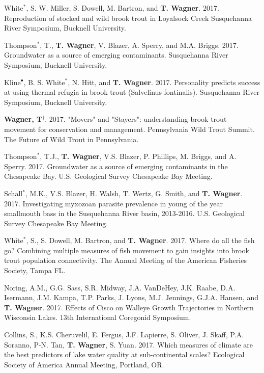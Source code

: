 \documentclass[10pt]{article}
\begin{document}
\begin{flushleft}
\begin{etaremune}
\item White$^*$, S. W. Miller, S. Dowell, M. Bartron, and {\bf T. Wagner}. 2017. Reproduction of stocked and wild brook trout in Loyalsock Creek  Susquehanna River Symposium, Bucknell University.

\item Thompson$^*$, T., {\bf T. Wagner}, V. Blazer, A. Sperry, and M.A. Briggs. 2017. Groundwater as a source of emerging contaminants. Susquehanna River Symposium, Bucknell University.

\item Kline$^\bullet$, B. S. White$^*$, N. Hitt, and {\bf T. Wagner}. 2017. Personality predicts success at using thermal refugia in brook trout (Salvelinus fontinalis). Susquehanna River Symposium, Bucknell University.

\item {\bf Wagner, T}$^\ddagger$. 2017. "Movers" and "Stayers": understanding brook trout movement for conservation and management. Pennsylvania Wild Trout Summit. The Future of Wild Trout in Pennsylvania.

\item Thompson$^*$, T.J., {\bf T. Wagner}, V.S. Blazer, P. Phillips, M. Briggs, and A. Sperry. 2017. Groundwater as a source of emerging contaminants in the Chesapeake Bay. U.S. Geological Survey Chesapeake Bay Meeting.

\item Schall$^*$, M.K., V.S. Blazer, H. Walsh, T. Wertz, G. Smith, and {\bf T. Wagner}. 2017. Investigating myxozoan parasite prevalence in young of the year smallmouth bass in the Susquehanna River basin, 2013-2016. U.S. Geological Survey Chesapeake Bay Meeting.

\item White$^*$, S., S. Dowell, M. Bartron, and {\bf T. Wagner}. 2017. Where do all the fish go? Combining multiple measures of fish movement to gain insights into brook trout population connectivity. The Annual Meeting of the American Fisheries Society, Tampa FL.

\item Noring, A.M., G.G. Sass, S.R. Midway, J.A. VanDeHey, J.K. Raabe, D.A. Isermann, J.M. Kampa, T.P. Parks, J. Lyons, M.J. Jennings, G.J.A. Hansen, and {\bf T. Wagner}. 2017. Effects of Cisco on Walleye Growth Trajectories in Northern Wisconsin Lakes. 13th International Coregonid Symposium.

\item Collins, S., K.S. Cheruvelil, E. Fergus, J.F. Lapierre, S. Oliver, J. Skaff, P.A. Soranno, P-N. Tan, {\bf T. Wagner}, S. Yuan. 2017. Which measures of climate are the best predictors of lake water quality at sub-continental scales? Ecological Society of America Annual Meeting, Portland, OR. 


\end{etaremune}
\end{flushleft}
\end{document}
